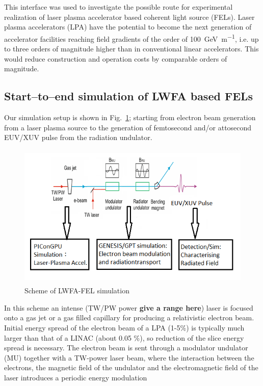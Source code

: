 This interface was used to investigate the possible
route for experimental realization of laser plasma accelerator based coherent
light source (FELs)\cite{Emma2004}. Laser plasma accelerators
(LPA)\cite{Leemans2006,Esarey2009,Tajima1979} have the potential to become the next
generation of accelerator facilities reaching field gradients of the order of
\SI{100}{\giga\electronvolt\per\metre}, i.e. up to three orders of magnitude
higher than in conventional linear accelerators. This would reduce construction
and operation costs by comparable orders of magnitude.

\subsection{Start--to--end simulation of LWFA based FELs\label{sec:lwfa_s2e}}
Our simulation setup is shown in Fig.~\ref{fig:lwfa-setup}; starting from electron
beam generation from a laser plasma source to the generation of femtosecond
and/or attosecond EUV/XUV pulse from the radiation undulator.
%
\begin{figure}[ht]
  \includegraphics[width=5.4165in,height=2.7374in]{figures/lwfafel-img001.png}
  \caption{Scheme of LWFA-FEL simulation}
  \label{fig:lwfa-setup}
\end{figure}
%
In this scheme an intense
(\si{\tera\watt}/\si{\peta\watt} power \textbf{give a range here})
laser is focused onto a gas jet or a gas filled capillary for producing a
relativistic electron beam. Initial energy spread of the electron beam of a
LPA (1-5\%) is typically much larger than that of a LINAC (about 0.05 \%), so
reduction of the slice energy spread is necessary. The electron beam is sent
through a modulator undulator (MU) together with a TW-power laser beam, where
the interaction between the electrons, the magnetic field of the undulator and
the electromagnetic field of the laser introduces a periodic energy modulation

